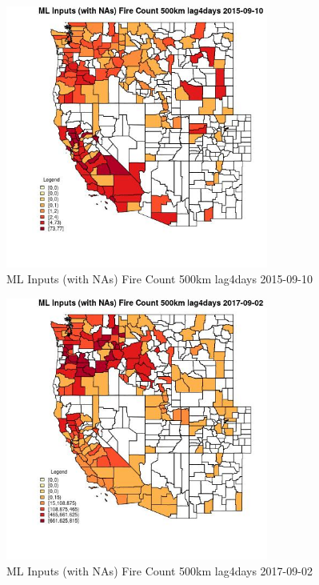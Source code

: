 \begin{figure} 
\centering  
\includegraphics[width=0.77\textwidth]{Code_Outputs/Report_ML_input_PM25_Step4_part_e_de_duplicated_aves_compiled_2019-05-21wNAs_CountyFire_Count_500km_lag4daysMean2015-09-10.jpg} 
\caption{\label{fig:Report_ML_input_PM25_Step4_part_e_de_duplicated_aves_compiled_2019-05-21wNAsCountyFire_Count_500km_lag4daysMean2015-09-10}ML Inputs (with NAs) Fire Count 500km lag4days 2015-09-10} 
\end{figure} 
 

\begin{figure} 
\centering  
\includegraphics[width=0.77\textwidth]{Code_Outputs/Report_ML_input_PM25_Step4_part_e_de_duplicated_aves_compiled_2019-05-21wNAs_CountyFire_Count_500km_lag4daysMean2017-09-02.jpg} 
\caption{\label{fig:Report_ML_input_PM25_Step4_part_e_de_duplicated_aves_compiled_2019-05-21wNAsCountyFire_Count_500km_lag4daysMean2017-09-02}ML Inputs (with NAs) Fire Count 500km lag4days 2017-09-02} 
\end{figure} 
 

